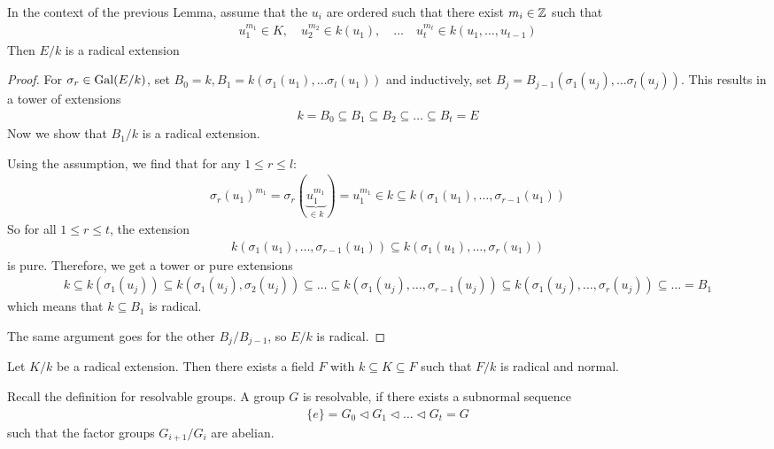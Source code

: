 \begin{lem}[]
In the context of the previous Lemma, assume that the $u_i$ are ordered such that there exist $m_i \in \mathbb{Z}$ such that
\begin{align*}
  u_1^{m_1} \in K, \quad u_2^{m_2} \in k(u_1), \quad \ldots \quad u_t^{m_t} \in k(u_1, \ldots, u_{t-1})
\end{align*}
Then $E/k$ is a radical extension
\end{lem}
\begin{proof}
  For $\sigma_r \in \operatorname{Gal}(E/k)$,
  set $B_0 = k, B_1 = k(\sigma_1(u_1), \ldots \sigma_l(u_1))$ and inductively, set $B_j = B_{j-1}(\sigma_1(u_j), \ldots \sigma_l(u_j))$.
This results in a tower of extensions
\begin{align*}
  k = B_0 \subseteq B_1 \subseteq B_2 \subseteq \ldots \subseteq B_t = E
\end{align*}
Now we show that $B_1/k$ is a radical extension.

Using the assumption, we find that for any $1 \leq r \leq l$:
\begin{align*}
  \sigma_r(u_1)^{m_1} = \sigma_r(\underbrace{u_1^{m_1}}_{\in k}) = u_1^{m_1} \in k \subseteq k(\sigma_1(u_1), \ldots, \sigma_{r-1}(u_1))
\end{align*}
So for all $1 \leq r \leq t$, the extension
\begin{align*}
  k(\sigma_1(u_1), \ldots, \sigma_{r-1}(u_1)) \subseteq k(\sigma_1(u_1), \ldots, \sigma_r(u_1))
\end{align*}
is pure. Therefore, we get a tower or pure extensions
\begin{align*}
  k \subseteq k(\sigma_1(u_j)) \subseteq k(\sigma_1(u_j),\sigma_2(u_j)) \subseteq \ldots \subseteq k(\sigma_1(u_j), \ldots, \sigma_{r-1}(u_j)) \subseteq k(\sigma_1(u_j),\ldots, \sigma_r(u_j)) \subseteq \ldots = B_1
\end{align*}
which means that $k \subseteq B_1$ is radical.

The same argument goes for the other $B_j/B_{j-1}$, so $E/k$ is radical.
\end{proof}

\begin{cor}[] \label{cor:radical-normal}
  Let $K/k$ be a radical extension. Then there exists a field $F$ with $k \subseteq K \subseteq F$ such that $F/k$ is radical and normal.
\end{cor}

Recall the definition for resolvable groups. A group $G$ is resolvable, if there exists a subnormal sequence
\begin{align*}
  \{e\} = G_0 \lhd G_1 \lhd \ldots \lhd G_t = G
\end{align*}
such that the factor groups $G_{i+1}/G_i$ are abelian.

